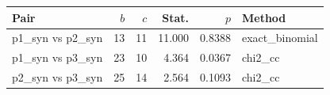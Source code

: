 \begin{tabular}{lrrrrl}
\toprule
Pair & $b$ & $c$ & Stat. & $p$ & Method \\
\midrule
p1_syn vs p2_syn & 13 & 11 & 11.000 & 0.8388 & exact\_binomial \\
p1_syn vs p3_syn & 23 & 10 & 4.364 & 0.0367 & chi2\_cc \\
p2_syn vs p3_syn & 25 & 14 & 2.564 & 0.1093 & chi2\_cc \\
\bottomrule
\end{tabular}
